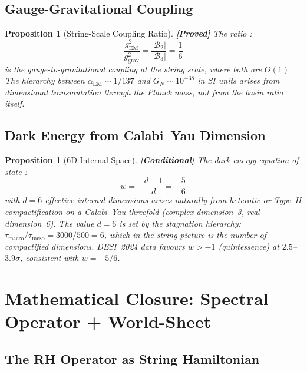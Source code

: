 \documentclass[12pt,a4paper]{article}
\newcommand{\proved}[1]{\textcolor{proved}{\textbf{[Proved]}} #1}
\newcommand{\conditional}[1]{\textcolor{conditional}{\textbf{[Conditional]}} #1}
\newtheorem{proposition}[theorem]{Proposition}
\theoremstyle{definition}\newtheorem{definition}[theorem]{Definition}
\theoremstyle{remark}\newtheorem{remark}[theorem]{Remark}
\newcommand{\Basin}{\mathcal{B}}
\begin{document}
\subsection{Gauge-Gravitational Coupling}

\begin{proposition}[String-Scale Coupling Ratio]
\label{prop:coupling}
\proved{The ratio \cite{paper3}:}
\begin{equation}
  \frac{g_{\mathrm{EM}}^2}{g_{\mathrm{grav}}^2}
  = \frac{|\Basin_2|}{|\Basin_3|} = \frac{1}{6}
\end{equation}
is the gauge-to-gravitational coupling at the string scale, where both are
$O(1)$. The hierarchy between $\alpha_{\mathrm{EM}} \sim 1/137$ and
$G_N \sim 10^{-38}$ in SI units arises from dimensional transmutation through
the Planck mass, not from the basin ratio itself.
\end{proposition}

\subsection{Dark Energy from Calabi--Yau Dimension}

\begin{proposition}[6D Internal Space]
\label{prop:dark_energy}
\conditional{The dark energy equation of state \cite{paper3}:}
\begin{equation}
  w = -\frac{d - 1}{d} = -\frac{5}{6}
\end{equation}
with $d = 6$ effective internal dimensions arises naturally from heterotic or
Type~II compactification on a Calabi--Yau threefold (complex dimension~3, real
dimension~6). The value $d = 6$ is set by the stagnation hierarchy:
$\tau_{\mathrm{macro}}/\tau_{\mathrm{meso}} = 3000/500 = 6$, which in the
string picture is the number of compactified dimensions. DESI~2024 data favours
$w > -1$ (quintessence) at $2.5$--$3.9\sigma$, consistent with $w = -5/6$.
\end{proposition}

\section{Mathematical Closure: Spectral Operator + World-Sheet}
\label{sec:closure}

\subsection{The RH Operator as String Hamiltonian}
\end{document}
